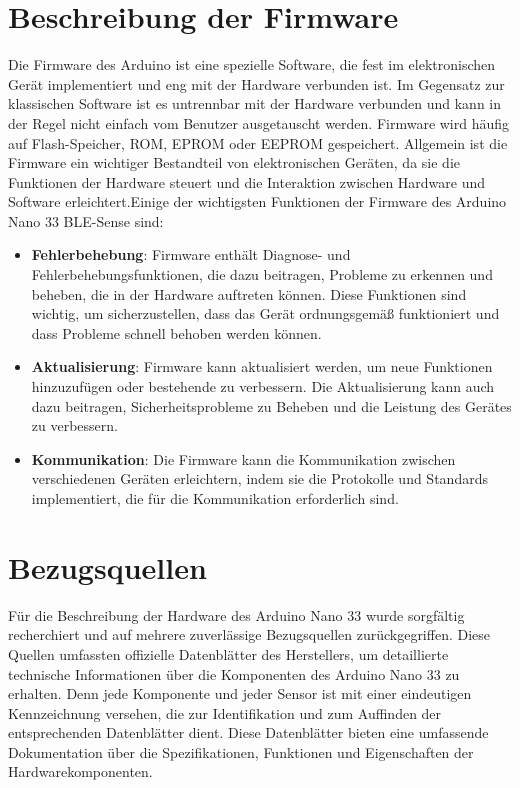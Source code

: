 \section{Beschreibung der Firmware}
Die Firmware des Arduino ist eine spezielle Software, die fest im elektronischen Gerät implementiert und eng mit der Hardware verbunden ist. Im Gegensatz zur klassischen Software ist es untrennbar mit der Hardware verbunden und kann in der Regel nicht einfach vom Benutzer ausgetauscht werden. Firmware wird häufig auf Flash-Speicher, ROM, EPROM oder EEPROM gespeichert. Allgemein ist die Firmware ein wichtiger Bestandteil von elektronischen Geräten, da sie die Funktionen der Hardware steuert und die Interaktion zwischen Hardware und Software erleichtert.Einige der wichtigsten Funktionen der Firmware des Arduino Nano 33 BLE-Sense sind:
\\ \cite{Bruhlmann.2012}
\begin{itemize}
	\item \textbf{Fehlerbehebung}: Firmware enthält Diagnose- und Fehlerbehebungsfunktionen, die dazu beitragen, Probleme zu erkennen und beheben, die in der Hardware auftreten können. Diese Funktionen sind wichtig, um sicherzustellen, dass das Gerät ordnungsgemäß funktioniert und dass Probleme schnell behoben werden können. 
	\item \textbf{Aktualisierung}: Firmware kann aktualisiert werden, um neue Funktionen hinzuzufügen oder bestehende zu verbessern. Die Aktualisierung kann auch dazu beitragen, Sicherheitsprobleme zu Beheben und die Leistung des Gerätes zu verbessern. 
	\item \textbf{Kommunikation}: Die Firmware kann die Kommunikation zwischen verschiedenen Geräten erleichtern, indem sie die Protokolle und Standards implementiert, die für die Kommunikation erforderlich sind.
\end{itemize}
\section{Bezugsquellen}
Für die Beschreibung der Hardware des Arduino Nano 33 wurde sorgfältig recherchiert und auf mehrere zuverlässige Bezugsquellen zurückgegriffen. Diese Quellen umfassten offizielle Datenblätter des Herstellers, um detaillierte technische Informationen über die Komponenten des Arduino Nano 33 zu erhalten. Denn jede Komponente und jeder Sensor ist mit einer eindeutigen Kennzeichnung versehen, die zur Identifikation und zum Auffinden der entsprechenden Datenblätter dient. Diese Datenblätter bieten eine umfassende Dokumentation über die Spezifikationen, Funktionen und Eigenschaften der Hardwarekomponenten.



